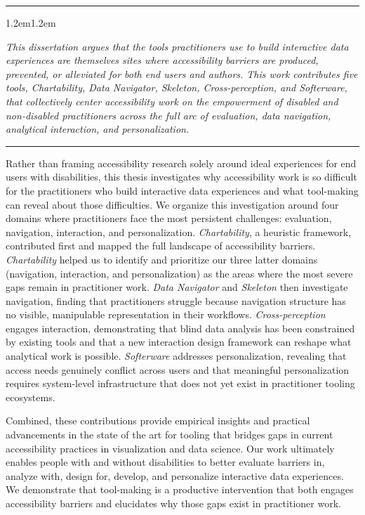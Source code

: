 \documentclass[12pt]{cmuthesis}
\newcommand{\thesisstatement}[1]{%
  \par\addvspace{1\baselineskip}%
  {\centering\noindent\rule{0.5\linewidth}{0.4pt}\par}%
  \addvspace{0.7\baselineskip}%
  \begin{adjustwidth}{1.2em}{1.2em}%
  {\itshape #1\par}%
  \end{adjustwidth}%
  \addvspace{0.7\baselineskip}%
  {\centering\noindent\rule{0.5\linewidth}{0.4pt}\par}%
  \addvspace{1\baselineskip}%
}
\begin{document}
\thesisstatement{This dissertation argues that the tools practitioners use to build interactive data experiences are themselves sites where accessibility barriers are produced, prevented, or alleviated for both end users and authors. This work contributes five tools, Chartability, Data Navigator, Skeleton, Cross-perception, and Softerware, that collectively center accessibility work on the empowerment of disabled and non-disabled practitioners across the full arc of evaluation, data navigation, analytical interaction, and personalization.}

Rather than framing accessibility research solely around ideal experiences for end users with disabilities, this thesis investigates why accessibility work is so difficult for the practitioners who build interactive data experiences and what tool-making can reveal about those difficulties. We organize this investigation around four domains where practitioners face the most persistent challenges: evaluation, navigation, interaction, and personalization. \textit{Chartability}, a heuristic framework, contributed first and mapped the full landscape of accessibility barriers. \textit{Chartability} helped us to identify and prioritize our three latter domains (navigation, interaction, and personalization) as the areas where the most severe gaps remain in practitioner work. \textit{Data Navigator} and \textit{Skeleton} then investigate navigation, finding that practitioners struggle because navigation structure has no visible, manipulable representation in their workflows. \textit{Cross-perception} engages interaction, demonstrating that blind data analysis has been constrained by existing tools and that a new interaction design framework can reshape what analytical work is possible. \textit{Softerware} addresses personalization, revealing that access needs genuinely conflict across users and that meaningful personalization requires system-level infrastructure that does not yet exist in practitioner tooling ecosystems.

Combined, these contributions provide empirical insights and practical advancements in the state of the art for tooling that bridges gaps in current accessibility practices in visualization and data science. Our work ultimately enables people with and without disabilities to better evaluate barriers in, analyze with, design for, develop, and personalize interactive data experiences. We demonstrate that tool-making is a productive intervention that both engages accessibility barriers and elucidates why those gaps exist in practitioner work.
\end{document}
